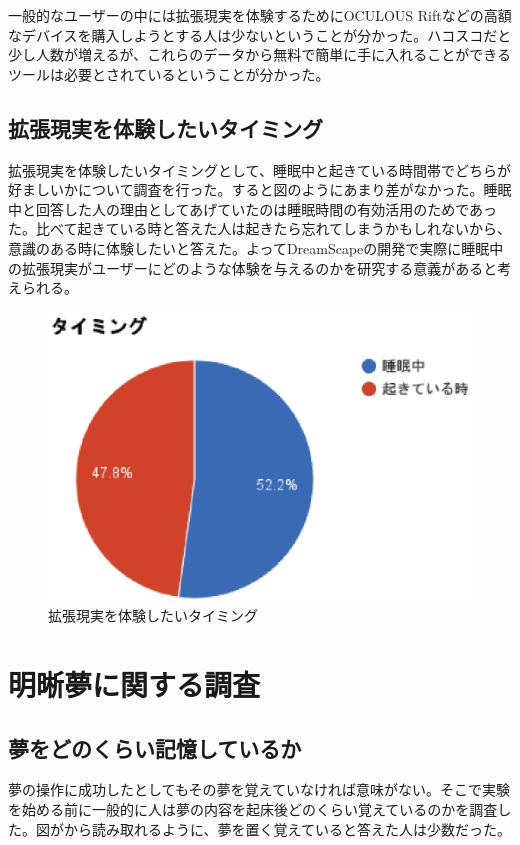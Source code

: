 一般的なユーザーの中には拡張現実を体験するためにOCULOUS Riftなどの高額なデバイスを購入しようとする人は少ないということが分かった。ハコスコだと少し人数が増えるが、これらのデータから無料で簡単に手に入れることができるツールは必要とされているということが分かった。

\subsection{拡張現実を体験したいタイミング}
拡張現実を体験したいタイミングとして、睡眠中と起きている時間帯でどちらが好ましいかについて調査を行った。すると図のようにあまり差がなかった。睡眠中と回答した人の理由としてあげていたのは睡眠時間の有効活用のためであった。比べて起きている時と答えた人は起きたら忘れてしまうかもしれないから、意識のある時に体験したいと答えた。よってDreamScapeの開発で実際に睡眠中の拡張現実がユーザーにどのような体験を与えるのかを研究する意義があると考えられる。

\begin{figure}[htbp]
\begin{center}
\includegraphics[width=15cm]{eps/timing.eps}
\caption{拡張現実を体験したいタイミング}
\label{拡張現実を体験したいタイミング}
\end{center}
\end{figure}

\section{明晰夢に関する調査}
\subsection{夢をどのくらい記憶しているか}
夢の操作に成功したとしてもその夢を覚えていなければ意味がない。そこで実験を始める前に一般的に人は夢の内容を起床後どのくらい覚えているのかを調査した。図がから読み取れるように、夢を置く覚えていると答えた人は少数だった。

